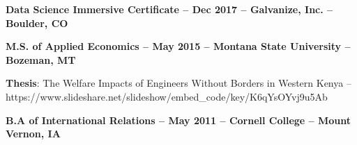 \documentclass[resmargin, centered, 10pt]{res}
\def \subwidth{13.5cm}
\newcommand{\tab}[1][1cm]{\hspace*{#1}}
\newcommand{\subtext}[1]{\tab[0.5cm] \parbox{\subwidth{}}{#1}}
\begin{document}
\begin{resume}
\textbf{Data Science Immersive Certificate -- Dec 2017 -- Galvanize, Inc. -- Boulder, CO}

\textbf{M.S. of Applied Economics -- May 2015 -- Montana State University --  Bozeman, MT}

\subtext{
	\textbf{Thesis}: 
	The Welfare Impacts of Engineers Without Borders in Western Kenya -- https://www.slideshare.net/slideshow/embed\_code/key/K6qYsOYvj9u5Ab
}

\textbf{B.A of International Relations -- May 2011 -- Cornell College -- Mount Vernon, IA}

\end{resume}
\end{document}
